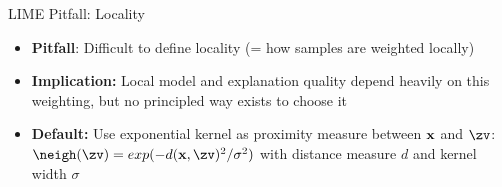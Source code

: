 \documentclass[10pt,compress,t,notes=noshow, xcolor=table]{beamer}
\begin{document}
\begin{frame}{LIME Pitfall: Locality}

	\begin{itemize} 
     \item \textbf{Pitfall}: Difficult to define locality (= how samples are weighted locally) %
     \item \textbf{Implication:} Local model and explanation quality depend heavily on this weighting, but no principled way exists to choose it

     \item \textbf{Default:} Use exponential kernel as proximity measure between $\mathbf{x}$ and $\zv$:\\
     	$\neigh(\zv) = exp(-d(\xv, \zv)^2/\sigma^2)$ with distance measure $d$ and kernel width $\sigma$
     		
     		

\end{itemize}
\end{frame}
\end{document}

